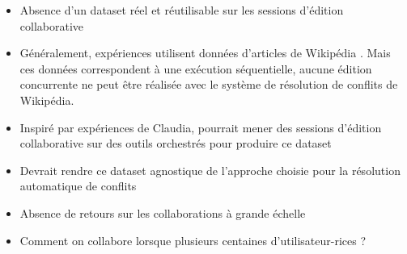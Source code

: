 \begin{itemize}
    \item Absence d'un dataset réel et réutilisable sur les sessions d'édition collaborative
    \item Généralement, expériences utilisent données d'articles de Wikipédia .
      Mais ces données correspondent à une exécution séquentielle, \ie aucune édition concurrente ne peut être réalisée avec le système de résolution de conflits de Wikipédia.
    \item Inspiré par expériences de Claudia, pourrait mener des sessions d'édition collaborative sur des outils orchestrés pour produire ce dataset
    \item Devrait rendre ce dataset agnostique de l'approche choisie pour la résolution automatique de conflits
    \item Absence de retours sur les collaborations à grande échelle
    \item Comment on collabore lorsque plusieurs centaines d'utilisateur-rices ?
  \end{itemize}
